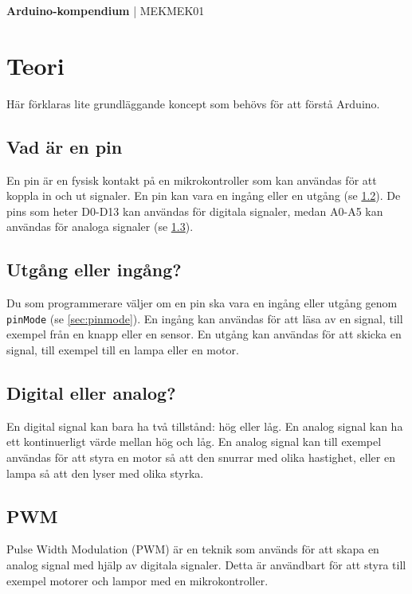 \documentclass[11pt]{article}
\begin{document}
\raggedright{}
\begin{center}
  \textbf{\huge{Arduino-kompendium}}
  \huge{| MEKMEK01}
\end{center}
\vspace{2em}

\thispagestyle{empty}
\tableofcontents\label{toc}
\begin{figure}[H]
\end{figure}

\newpage

\section{Teori}
Här förklaras lite grundläggande koncept som behövs för att förstå Arduino.

\subsection{Vad är en pin}\label{sec:pin}
En pin är en fysisk kontakt på en mikrokontroller som kan användas för att
koppla in och ut signaler. En pin kan vara en ingång eller en utgång (se
\ref{sec:io}). De pins som heter D0-D13 kan användas för digitala signaler,
medan A0-A5 kan användas för analoga signaler (se \ref{sec:analog-digital}).

\subsection{Utgång eller ingång?}\label{sec:io}
Du som programmerare väljer om en pin ska vara en ingång eller utgång genom
\texttt{pinMode} (se \ref{sec:pinmode}). En ingång kan användas för att läsa av
en signal, till exempel från en knapp eller en sensor. En utgång kan användas
för att skicka en signal, till exempel till en lampa eller en motor.

\subsection{Digital eller analog?}\label{sec:analog-digital}
En digital signal kan bara ha två tillstånd: hög eller låg. En analog signal
kan ha ett kontinuerligt värde mellan hög och låg. En analog signal kan till
exempel användas för att styra en motor så att den snurrar med olika hastighet,
eller en lampa så att den lyser med olika styrka.

\subsection{PWM}\label{sec:pwm}
Pulse Width Modulation (PWM) är en teknik som används för att skapa en analog
signal
med hjälp av digitala signaler. Detta är användbart för att styra till exempel
motorer och lampor med en mikrokontroller.
\end{document}

